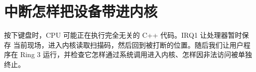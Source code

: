 \chapter{中断怎样把设备带进内核}

按下键盘时，CPU 可能正在执行完全无关的 C++ 代码。IRQ1 让处理器暂时保存
当前现场，进入内核读取扫描码，然后回到被打断的位置。随后我们让用户程序在
Ring 3 运行，并检查它怎样通过系统调用进入内核、怎样因非法访问被单独终止。





